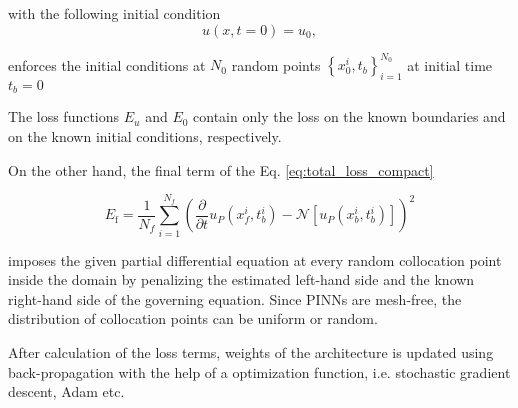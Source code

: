 \noindent with the following initial condition
\begin{equation}
    \label{eq:initial}
    u(x, t=0)=u_{0},
\end{equation}

\noindent enforces the initial conditions at $N_{0}$ random points 
$\left\{x_{0}^{i}, t_{b} \right\}_{i=1}^{N_{0}}$ at initial time $t_{b}=0$

\vspace{4mm}

The loss functions $E_{u}$ and $E_{0}$ contain only the loss on the known boundaries and
on the known initial conditions, respectively.

On the other hand, the final term of the Eq. \ref{eq:total_loss_compact}

\begin{equation}
    \label{eq:res_loss}   
    E_{\text {f}}=\frac{1}{N_{f}} \sum_{i=1}^{N_{f}}\left(\frac{\partial}{\partial t} u_{P}\left(x_{f}^{i}, t_{b}^{i} \right)-\mathcal{N}[u_{P}(x_{b}^{i}, t_{b}^{i})]\right)^{2}
\end{equation}

\noindent imposes the given partial differential equation at every random collocation point inside the domain by penalizing the estimated 
left-hand side and the known right-hand side of the governing equation. Since PINNs are mesh-free, the distribution of 
collocation points can be uniform or random.

After calculation of the loss terms, weights of the architecture is updated using back-propagation with the help of a optimization function,
i.e. stochastic gradient descent, Adam etc. 

